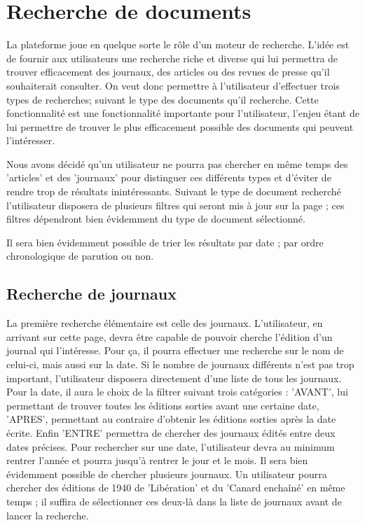 \section{Recherche de documents}
\label{sec:recherche}

La plateforme joue en quelque sorte le rôle d'un moteur de recherche. L'idée est de fournir aux utilisateurs une recherche riche et diverse qui lui permettra de trouver efficacement des journaux, des articles ou des revues de presse qu'il souhaiterait consulter. On veut donc permettre à l'utilisateur d'effectuer trois types de recherches; suivant le type des documents qu'il recherche. Cette fonctionnalité est une fonctionnalité importante pour l'utilisateur, l'enjeu étant de lui permettre de trouver le plus efficacement possible des documents qui peuvent l'intéresser.

Nous avons décidé qu'un utilisateur ne pourra pas chercher en même temps des 'articles' et des 'journaux' pour distinguer ces différents types et d'éviter de rendre trop de résultats inintéressants. Suivant le type de document recherché l'utilisateur disposera de plusieurs filtres qui seront mis à jour sur la page ; ces filtres dépendront bien évidemment du type de document sélectionné.

Il sera bien évidemment possible de trier les résultats par date ; par ordre chronologique de parution ou non.

\subsection{Recherche de journaux}
\label{sec:recherche_journal}

La première recherche élémentaire est celle des journaux. L'utilisateur, en arrivant sur cette page, devra être capable de pouvoir cherche l'édition d'un journal qui l'intéresse. Pour ça, il pourra effectuer une recherche sur le nom de celui-ci, mais aussi sur la date. Si le nombre de journaux différents n'est pas trop important, l'utilisateur disposera directement d'une liste de tous les journaux. Pour la date, il aura le choix de la filtrer suivant trois catégories : 'AVANT', lui permettant de trouver toutes les éditions sorties avant une certaine date, 'APRES', permettant au contraire d'obtenir les éditions sorties après la date écrite. Enfin 'ENTRE' permettra de chercher des journaux édités entre deux dates précises. Pour rechercher sur une date, l'utilisateur devra au minimum rentrer l'année et pourra jusqu'à rentrer le jour et le mois. Il sera bien évidemment possible de chercher plusieurs journaux. Un utilisateur pourra chercher des éditions de 1940 de 'Libération' et du 'Canard enchaîné' en même temps ; il suffira de sélectionner ces deux-là dans la liste de journaux avant de lancer la recherche.


